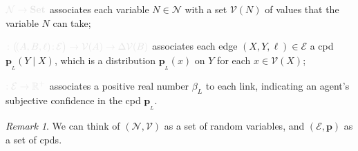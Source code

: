 \documentclass{article}
\theoremstyle{plain}
\theoremstyle{definition}
\theoremstyle{remark}
\newtheorem*{remark}{Remark}
\newcommand\mat[1]{\mathbf{#1}}
\newcommand{\notation}[2][]{#1}
\renewcommand{\notation}[2][]{{\color{notationcolor} #2}}
\newcommand{\bp}[1][L]{\mat{p}_{\!_{#1}\!}}
\newcommand{\V}{\mathcal V}
\newcommand{\N}{\mathcal N}
\newcommand{\Ed}{\mathcal E}
\newcommand{\MN}{PDG}
\numberwithin{equation}{section}
\begin{document}
\begin{defn}[\MN]
\begin{description}[nosep]
			\item[$\V$] $\notation{\N \to \mathbf{Set}}$
                          associates each variable $N \in \N$ with a set
                          $\V(N)$ of values that the variable $N$ can take;
          	\item[$\mat p$] $\notation{\colon \big(\!({A,B,\ell})\colon \! \Ed \big) \to \V(A) \to \Delta\V(B)}$
			associates each edge $(X,Y,\ell) \in \Ed$ a cpd $\bp(Y \mid X)$, which is a distribution $\bp(x)$ on $Y$ for each $x \in \V(X)$;
 			
 			\item[$\beta$] $\notation{:\Ed \to \mathbb R^+ }$ associates a positive real number $\beta_L$ to each link, indicating an agent's subjective confidence in the cpd $\bp$.
		\end{description}
	\end{defn}
	\begin{vfull}
	\begin{remark}
		We can think of $(\N, \V)$ as a set of random variables, and $(\Ed,\mat p)$ as a set of cpds.
	\end{remark}
	\end{vfull}
\end{document}
